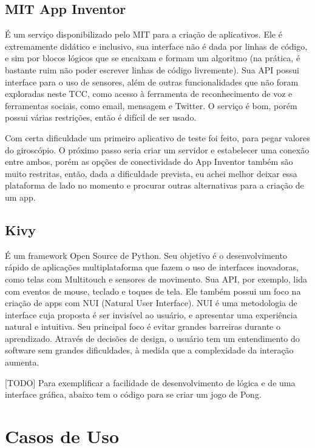 \documentclass[a4paper,12pt]{article}
\begin{document}
\subsection{MIT App Inventor}

É um serviço disponibilizado pelo MIT para a criação de aplicativos. Ele é extremamente didático e inclusivo, sua interface não é dada por linhas de código, e sim por blocos lógicos que se encaixam e formam um algoritmo (na prática, é bastante ruim não poder escrever linhas de código livremente). Sua API possui interface para o uso de sensores, além de outras funcionalidades que não foram exploradas neste TCC, como acesso à ferramenta de reconhecimento de voz e ferramentas sociais, como email, mensagem e Twitter. O serviço é bom, porém possui várias restrições, então é difícil de ser usado.


Com certa dificuldade um primeiro aplicativo de teste foi feito, para pegar valores do giroscópio. O próximo passo seria criar um servidor e estabelecer uma conexão entre ambos, porém as opções de conectividade do App Inventor também são muito restritas, então, dada a dificuldade prevista, eu achei melhor deixar essa plataforma de lado no momento e procurar outras alternativas para a criação de um app.


\subsection{Kivy}

É um framework Open Source de Python. Seu objetivo é o desenvolvimento rápido de aplicações multiplataforma que fazem o uso de interfaces inovadoras, como telas com Multitouch e sensores de movimento. Sua API, por exemplo, lida com eventos de mouse, teclado e toques de tela. Ele também possui um foco na criação de apps com NUI (Natural User Interface).
  NUI é uma metodologia de interface cuja proposta é ser invisível ao usuário, e apresentar uma experiência natural e intuitiva. Seu principal foco é evitar grandes barreiras durante o aprendizado. Através de decisões de design, o usuário tem um entendimento do software sem grandes dificuldades, à medida que a complexidade da interação aumenta.

[TODO] Para exemplificar a facilidade de desenvolvimento de lógica e de uma interface gráfica, abaixo tem o código para se criar um jogo de Pong.



\section{Casos de Uso}
\end{document}

